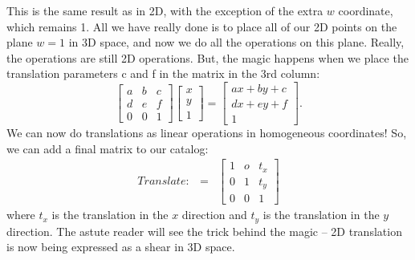\documentclass[11pt]{amsart}
\begin{document}
This is the same result as in 2D, with the exception of the extra $w$ coordinate, which remains 1.
All we have really done is to place all of our 2D
points on the plane $w = 1$ in 3D space, and now
we do all the operations on this plane. Really, the
operations are still 2D operations.
But, the magic happens when we place the translation parameters c and f in the matrix
in the 3rd column:
\begin{equation}
\begin{bmatrix}
a & b & c \\
d & e & f \\
0 & 0 & 1
\end{bmatrix}
\begin{bmatrix}
x \\
y \\
1
\end{bmatrix}
=
\begin{bmatrix}
ax + by +c\\
dx + ey +f \\
1
\end{bmatrix}.
\end{equation}
We can now do translations as linear operations in homogeneous coordinates! So, we can
add a final matrix to our catalog:
\begin{eqnarray}
Translate: & = & 
\begin{bmatrix}
1 & o & t_x \\
0 & 1 & t_y \\
0 & 0 & 1
\end{bmatrix}
\end{eqnarray}
where $t_x$ is the translation in the $x$ direction and $t_y$ is the translation in the $y$ direction. The
astute reader will see the trick behind the magic – 2D translation is now being expressed
as a shear in 3D space.


 
\end{document}
